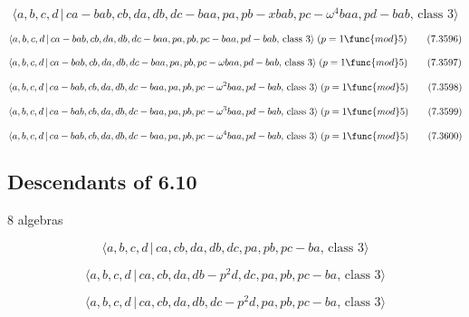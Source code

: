 \documentclass[10pt]{article}
\begin{document}
\begin{equation}
\langle a,b,c,d\,|\,ca-bab,cb,da,db,dc-baa,pa,pb-xbab,pc-\omega
^{4}baa,pd-bab,\,\text{class }3\rangle  \tag{7.3595}
\end{equation}

\begin{equation}
\langle a,b,c,d\,|\,ca-bab,cb,da,db,dc-baa,pa,pb,pc-baa,pd-bab,\,\text{class 
}3\rangle \;(p=1 \func{mod} 5)  \tag{7.3596}
\end{equation}

\begin{equation}
\langle a,b,c,d\,|\,ca-bab,cb,da,db,dc-baa,pa,pb,pc-\omega baa,pd-bab,\,%
\text{class }3\rangle \;(p=1\func{mod}5)  \tag{7.3597}
\end{equation}

\begin{equation}
\langle a,b,c,d\,|\,ca-bab,cb,da,db,dc-baa,pa,pb,pc-\omega ^{2}baa,pd-bab,\,%
\text{class }3\rangle \;(p=1\func{mod}5)  \tag{7.3598}
\end{equation}

\begin{equation}
\langle a,b,c,d\,|\,ca-bab,cb,da,db,dc-baa,pa,pb,pc-\omega ^{3}baa,pd-bab,\,%
\text{class }3\rangle \;(p=1\func{mod}5)  \tag{7.3599}
\end{equation}

\begin{equation}
\langle a,b,c,d\,|\,ca-bab,cb,da,db,dc-baa,pa,pb,pc-\omega ^{4}baa,pd-bab,\,%
\text{class }3\rangle \;(p=1\func{mod}5)  \tag{7.3600}
\end{equation}

\subsection{Descendants of 6.10}

8 algebras

\begin{equation}
\langle a,b,c,d\,|\,ca,cb,da,db,dc,pa,pb,pc-ba,\,\text{class }3\rangle 
\tag{7.3601}
\end{equation}

\begin{equation}
\langle a,b,c,d\,|\,ca,cb,da,db-p^2d,dc,pa,pb,pc-ba,\,\text{class }3\rangle 
\tag{7.3602}
\end{equation}

\begin{equation}
\langle a,b,c,d\,|\,ca,cb,da,db,dc-p^2d,pa,pb,pc-ba,\,\text{class }3\rangle 
\tag{7.3603}
\end{equation}
\end{document}
